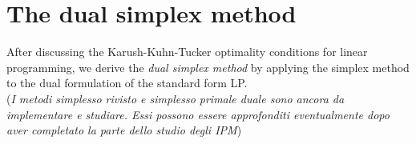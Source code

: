 \documentclass[a4paper,10 pt,titlepage,twoside]{book}
\theoremstyle{plain}
\theoremstyle{definition}
\theoremstyle{remark}
\begin{document}
 \section{The dual simplex method}
After discussing the Karush-Kuhn-Tucker optimality conditions for linear programming, we derive the \textit{dual simplex method} by applying the simplex method to the dual formulation of the standard form LP. 
\\
(\textit{I metodi simplesso rivisto e simplesso primale duale sono ancora da implementare e studiare. Essi possono essere approfonditi eventualmente dopo aver completato la parte dello studio degli IPM})
\end{document}
